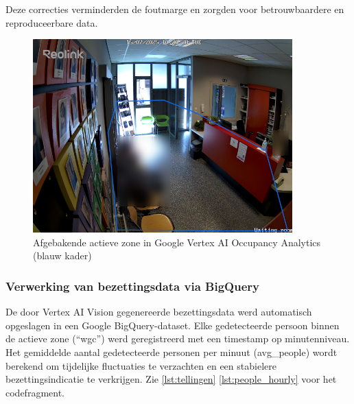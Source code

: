 Deze correcties verminderden de foutmarge en zorgden voor betrouwbaardere en reproduceerbare data.

\begin{figure}[H] 
    \centering
    \includegraphics[width=10cm]{img/bp/vertex/active-zone (1).png}
    \caption{Afgebakende actieve zone in Google Vertex AI Occupancy Analytics (blauw kader)}
    \label{fig:active-zone}
\end{figure}
       

    
    

\subsubsection{Verwerking van bezettingsdata via BigQuery}
De door Vertex AI Vision gegenereerde bezettingsdata werd automatisch opgeslagen in een Google BigQuery-dataset. Elke gedetecteerde persoon binnen de actieve zone (“wgc”) werd geregistreerd met een timestamp op minutenniveau. Het gemiddelde aantal gedetecteerde personen per minuut (avg\_people) wordt berekend om tijdelijke fluctuaties te verzachten en een stabielere bezettingsindicatie te verkrijgen.  Zie \ref{lst:tellingen} \ref{lst:people_hourly} voor het codefragment.

